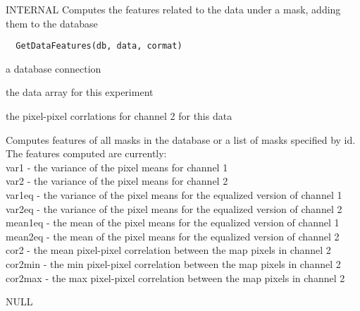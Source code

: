 \documentclass[a4paper]{book}
\begin{document}
%
\begin{Description}\relax
INTERNAL Computes the features related to the data under
a mask, adding them to the database
\end{Description}
%
\begin{Usage}
\begin{verbatim}
  GetDataFeatures(db, data, cormat)
\end{verbatim}
\end{Usage}
%
\begin{Arguments}
\begin{ldescription}
\item[\code{db}] a database connection

\item[\code{data}] the data array for this experiment

\item[\code{cormat}] the pixel-pixel corrlations for channel 2
for this data
\end{ldescription}
\end{Arguments}
%
\begin{Details}\relax
Computes features of all masks in the database or a list
of masks specified by id.  The features computed are
currently:\\{} var1 - the variance of the pixel means for
channel 1 \\{} var2 - the variance of the pixel means for
channel 2\\{} var1eq - the variance of the pixel means for
the equalized version of channel 1\\{} var2eq - the
variance of the pixel means for the equalized version of
channel 2\\{} mean1eq - the mean of the pixel means for
the equalized version of channel 1\\{} mean2eq - the mean
of the pixel means for the equalized version of channel
2\\{} cor2 - the mean pixel-pixel correlation between the
map pixels in channel 2\\{} cor2min - the min pixel-pixel
correlation between the map pixels in channel 2\\{}
cor2max - the max pixel-pixel correlation between the map
pixels in channel 2\\{}
\end{Details}
%
\begin{Value}
NULL
\end{Value}
\end{document}
